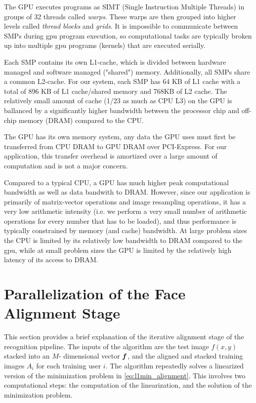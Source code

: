 \documentclass[10pt,twocolumn,letterpaper]{article}
\begin{document}
The GPU executes programs as SIMT (Single Instruction Multiple Threads) in
groups of 32 threads called \emph{warps}.  These warps are then grouped into
higher levels called \emph{thread blocks} and \emph{grids}.  It is impossible
to communicate between SMPs during gpu program execution, so computational tasks
are typically broken up into multiple gpu programs (kernels) that are executed
serially.  

Each SMP contains its own L1-cache, which is divided between hardware managed
and software managed ("shared") memory.  Additionally, all SMPs share a common
L2-cache.  For our system, each SMP has 64 KB of L1 cache with a total of 896
KB of L1 cache/shared memory and 768KB of L2 cache. The relatively small amount
of cache (1/23 as much as CPU L3) on the GPU is ballanced by a significantly
higher bandwidth between the processor chip and off-chip memory (DRAM) compared
to the CPU.  

The GPU has its own memory system, any data the GPU uses must first be
transferred from CPU DRAM to GPU DRAM over PCI-Express.  For our application,
this transfer overhead is amortized over a large amount of computation and is
not a major concern.

Compared to a typical CPU, a GPU has much higher peak computational bandwidth
as well as data bandwith to DRAM.  However, since our application is primarily
of matrix-vector operations and image resampling operations, it has a very low
arithmetic intensity (i.e. we perform a very small number of arithmetic
operations for every number that has to be loaded), and thus performance is
typically constrained by memory (and cache) bandwidth.  At large problem sizes
the CPU is limited by its relatively low bandwidth to DRAM compared to the gpu,
while at small problem sizes the GPU is limited by the relatively high latency
of its access to DRAM. 

\section{Parallelization of the Face Alignment Stage}
\label{sec:alignment}
This section provides a brief explanation of the iterative alignment stage
of the recognition pipeline.  
The inputs of the algorithm are the test image $f(x,y)$ stacked into an $M$-
dimensional vector $\boldsymbol{f}$, and the aligned and stacked training images $A_i$ for
each training user $i$. 
The algorithm repeatedly solves a linearized version of the minimization problem
in \eqref{eq:l1min_alignment}.  This involves two computational steps:
the computation of the linearization, and the solution of the minimization problem.
\end{document}
